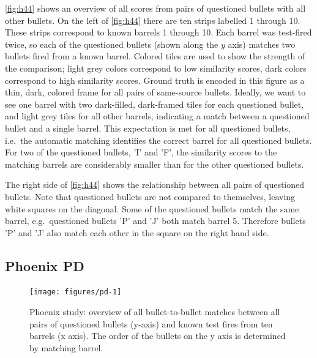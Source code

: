 \documentclass[doubleblind]{elsarticle}\usepackage[]{graphicx}\usepackage[]{color}
\newenvironment{knitrout}{}{} %
\begin{document}
\autoref{fig:h44} shows an overview of all scores from pairs of questioned bullets with all other bullets. On the left of \autoref{fig:h44} there are ten strips labelled 1 through 10. These strips correspond to known barrels 1 through 10. Each barrel was test-fired twice, so each of the questioned bullets (shown along the $y$ axis) matches two bullets fired from a known barrel. Colored tiles are used to show the strength of the comparison; light grey colors correspond to low similarity scores, dark colors correspond to high similarity scores. Ground truth is encoded in this figure as a thin, dark, colored frame for all pairs of same-source bullets. 
Ideally, we want to see one barrel with two dark-filled, dark-framed tiles for each questioned bullet, and light grey tiles for all other barrels, indicating a match between a questioned bullet and a single barrel. This expectation is met for all questioned bullets, i.e.\ the automatic matching  identifies the correct barrel for all questioned bullets. For two of the questioned bullets, 'I' and 'F', the similarity scores to the matching barrels are considerably smaller than for the other questioned bullets. 

The right side of \autoref{fig:h44} shows the relationship between all pairs of questioned bullets. Note that questioned bullets are not compared to themselves, leaving white squares on the diagonal. Some of the questioned bullets match the same barrel, e.g.\ questioned bullets 'P' and 'J' both match barrel 5. Therefore bullets 'P' and 'J' also match each other in the square on the right hand side.



\subsection{Phoenix PD}

\begin{knitrout}
\color{fgcolor}\begin{figure}

{\centering \texttt{[image: figures/pd-1]} 

}

\caption[Phoenix study]{Phoenix study: overview of all bullet-to-bullet matches between all pairs of questioned bullets (y-axis) and known test fires from ten barrels (x axis). The order of the bullets on the y axis is determined by matching barrel.}\label{fig:pd}
\end{figure}


\end{knitrout}
\end{document}
